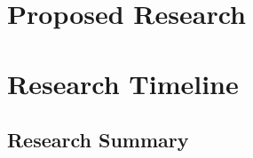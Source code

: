 \documentclass[11pt]{report}
\begin{document}
\chapter{Proposed Research}  \label{ch::ProposedResearch}

\chapter{Research Timeline}  \label{ch::ResearchTimeline}

 



\begin{appendices}
      \chapter{Research Summary}  \label{app::ResearchSummary}
\end{appendices}  
\end{document}
